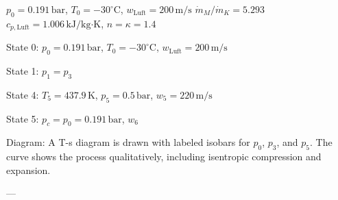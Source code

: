 \( p_0 = 0.191 \, \text{bar} \), \( T_0 = -30^\circ \text{C} \), \( w_{\text{Luft}} = 200 \, \text{m/s} \)  
\( \dot{m}_M / \dot{m}_K = 5.293 \)  
\( c_{p,\text{Luft}} = 1.006 \, \text{kJ/kg·K} \), \( n = \kappa = 1.4 \)  

State 0:  
\( p_0 = 0.191 \, \text{bar} \), \( T_0 = -30^\circ \text{C} \), \( w_{\text{Luft}} = 200 \, \text{m/s} \)  

State 1:  
\( p_1 = p_3 \)  

State 4:  
\( T_5 = 437.9 \, \text{K} \), \( p_5 = 0.5 \, \text{bar} \), \( w_5 = 220 \, \text{m/s} \)  

State 5:  
\( p_c = p_0 = 0.191 \, \text{bar} \), \( w_6 \)  

Diagram:  
A T-s diagram is drawn with labeled isobars for \( p_0 \), \( p_3 \), and \( p_5 \). The curve shows the process qualitatively, including isentropic compression and expansion.  

---
